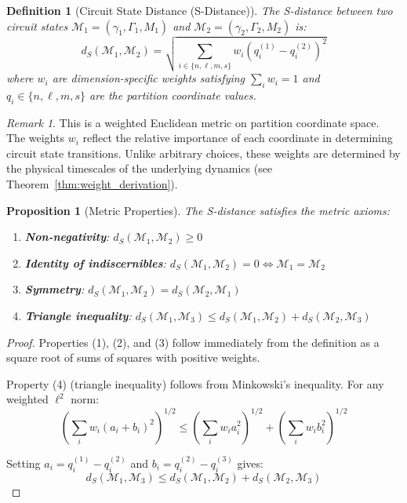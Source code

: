 \documentclass[aps,prd,twocolumn,superscriptaddress,floatfix,nofootinbib]{revtex4-2}
\newtheorem{definition}[theorem]{Definition}
\newtheorem{proposition}[theorem]{Proposition}
\theoremstyle{remark}
\newtheorem{remark}[theorem]{Remark}
\begin{document}
\begin{definition}[Circuit State Distance (S-Distance)]
\label{def:sdistance}
The S-distance between two circuit states $\mathcal{M}_1 = (\gamma_1, \Gamma_1, M_1)$ and $\mathcal{M}_2 = (\gamma_2, \Gamma_2, M_2)$ is:
\begin{equation}
d_S(\mathcal{M}_1, \mathcal{M}_2) = \sqrt{\sum_{i \in \{n,\ell,m,s\}} w_i (q_i^{(1)} - q_i^{(2)})^2}
\end{equation}
where $w_i$ are dimension-specific weights satisfying $\sum_i w_i = 1$ and $q_i \in \{n, \ell, m, s\}$ are the partition coordinate values.
\end{definition}

\begin{remark}
This is a weighted Euclidean metric on partition coordinate space. The weights $w_i$ reflect the relative importance of each coordinate in determining circuit state transitions. Unlike arbitrary choices, these weights are determined by the physical timescales of the underlying dynamics (see Theorem~\ref{thm:weight_derivation}).
\end{remark}

\begin{proposition}[Metric Properties]
\label{prop:sdist_metric}
The S-distance satisfies the metric axioms:
\begin{enumerate}
\item \textbf{Non-negativity}: $d_S(\mathcal{M}_1, \mathcal{M}_2) \geq 0$
\item \textbf{Identity of indiscernibles}: $d_S(\mathcal{M}_1, \mathcal{M}_2) = 0 \iff \mathcal{M}_1 = \mathcal{M}_2$
\item \textbf{Symmetry}: $d_S(\mathcal{M}_1, \mathcal{M}_2) = d_S(\mathcal{M}_2, \mathcal{M}_1)$
\item \textbf{Triangle inequality}: $d_S(\mathcal{M}_1, \mathcal{M}_3) \leq d_S(\mathcal{M}_1, \mathcal{M}_2) + d_S(\mathcal{M}_2, \mathcal{M}_3)$
\end{enumerate}
\end{proposition}

\begin{proof}
Properties (1), (2), and (3) follow immediately from the definition as a square root of sums of squares with positive weights.

Property (4) (triangle inequality) follows from Minkowski's inequality. For any weighted $\ell^2$ norm:
$$
\left(\sum_i w_i (a_i + b_i)^2\right)^{1/2} \leq \left(\sum_i w_i a_i^2\right)^{1/2} + \left(\sum_i w_i b_i^2\right)^{1/2}
$$

Setting $a_i = q_i^{(1)} - q_i^{(2)}$ and $b_i = q_i^{(2)} - q_i^{(3)}$ gives:
$$
d_S(\mathcal{M}_1, \mathcal{M}_3) \leq d_S(\mathcal{M}_1, \mathcal{M}_2) + d_S(\mathcal{M}_2, \mathcal{M}_3)
$$
\end{proof}
\end{document}
